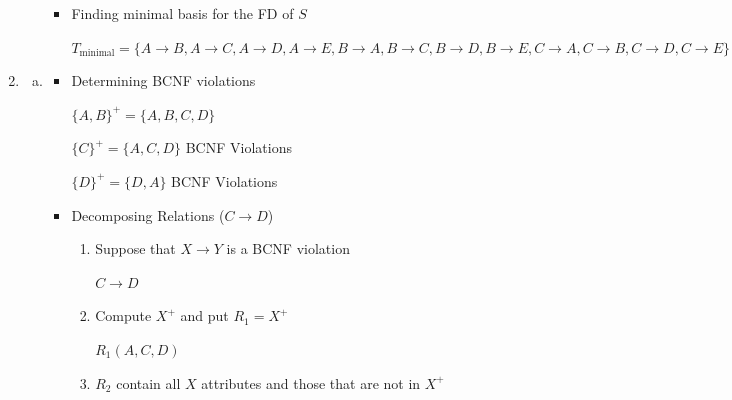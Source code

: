 \documentclass[12pt]{article}
\begin{document}
\begin{enumerate}[1.]
\begin{enumerate}[a)]
\begin{itemize}
            \item Finding minimal basis for the FD of $S$

            $T_{\text{minimal}} = \{
                    A \to B,
                    A \to C,
                    A \to D,
                    A \to E,
                    B \to A,
                    B \to C,
                    B \to D,
                    B \to E,
                    C \to A,
                    C \to B,
                    C \to D,
                    C \to E
            \}$

        \end{itemize}

    \end{enumerate}

    \item

    \begin{enumerate}[a)]

        \item


        \begin{itemize}
            \item Determining BCNF violations


            \bigskip

            $\{A,B\}^+ = \{A,B,C,D\}$

            \bigskip

            $\{C\}^+ = \{A,C,D\}$ \color{red}BCNF Violations\color{black}

            \bigskip

            $\{D\}^+ = \{D,A\}$ \color{red}BCNF Violations\color{black}

            \bigskip

            \item Decomposing Relations ($C \to D$)

            \begin{enumerate}[1.]
                \item Suppose that $X \to Y$ is a BCNF violation

                \color{red}
                $C \to D$
                \color{black}

                \item Compute $X^+$ and put $R_1 = X^+$

                \color{red}
                $R_1(A,C,D)$
                \color{black}

                \item $R_2$ contain all $X$ attributes and those that are not in $X^+$


\end{enumerate}
\end{itemize}
\end{enumerate}
\end{enumerate}
\end{document}
